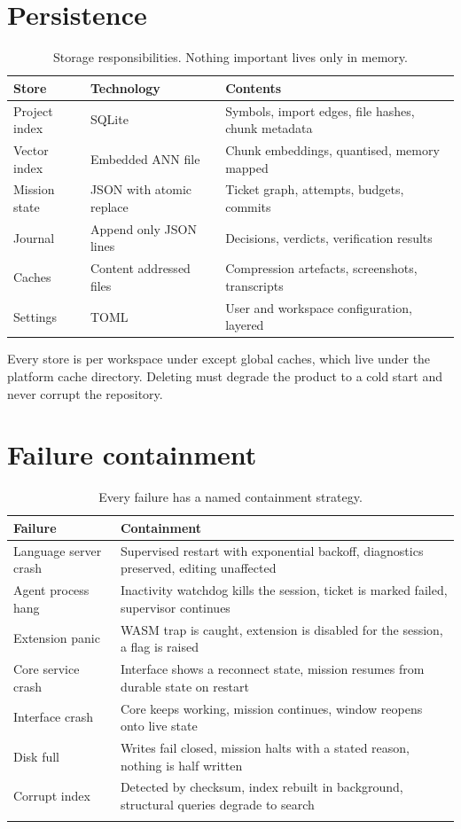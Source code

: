 \section{Persistence}

\begin{table}[h]
\centering
\small
\begin{tabularx}{\textwidth}{l l X}
\toprule
\textbf{Store} & \textbf{Technology} & \textbf{Contents} \\
\midrule
Project index & SQLite & Symbols, import edges, file hashes, chunk metadata \\
Vector index & Embedded ANN file & Chunk embeddings, quantised, memory mapped \\
Mission state & JSON with atomic replace & Ticket graph, attempts, budgets, commits \\
Journal & Append only JSON lines & Decisions, verdicts, verification results \\
Caches & Content addressed files & Compression artefacts, screenshots, transcripts \\
Settings & TOML & User and workspace configuration, layered \\
\bottomrule
\end{tabularx}
\caption{Storage responsibilities. Nothing important lives only in memory.}
\end{table}

Every store is per workspace under  except global caches, which live under the
platform cache directory. Deleting  must degrade the product to a cold start and
never corrupt the repository.

\section{Failure containment}

\begin{longtable}{@{}p{} p{}@{}}
\toprule
\textbf{Failure} & \textbf{Containment} \\
\midrule
\endhead
Language server crash & Supervised restart with exponential backoff, diagnostics preserved, editing unaffected \\
Agent process hang & Inactivity watchdog kills the session, ticket is marked failed, supervisor continues \\
Extension panic & WASM trap is caught, extension is disabled for the session, a flag is raised \\
Core service crash & Interface shows a reconnect state, mission resumes from durable state on restart \\
Interface crash & Core keeps working, mission continues, window reopens onto live state \\
Disk full & Writes fail closed, mission halts with a stated reason, nothing is half written \\
Corrupt index & Detected by checksum, index rebuilt in background, structural queries degrade to search \\
\bottomrule
\caption{Every failure has a named containment strategy.}
\end{longtable}
